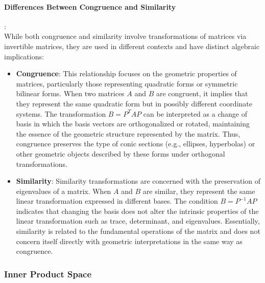 \documentclass[11pt]{book} %
\begin{document}
\paragraph{Differences Between Congruence and Similarity}: \\

While both congruence and similarity involve transformations of matrices via invertible matrices, they are used in different contexts and have distinct algebraic implications:

\begin{itemize}
    \item \textbf{Congruence}: This relationship focuses on the geometric properties of matrices, 
    particularly those representing quadratic forms or symmetric bilinear forms. When two matrices \( A \) and \( B \) are congruent, 
    it implies that they represent the same quadratic form but in possibly different coordinate systems. 
    The transformation \( B = P^T A P \) can be interpreted as a change of basis in which the basis vectors are orthogonalized or rotated, 
    maintaining the essence of the geometric structure represented by the matrix. 
    Thus, congruence preserves the type of conic sections (e.g., ellipses, hyperbolas) or other geometric objects described by these forms under orthogonal transformations.

    \item \textbf{Similarity}: Similarity transformations are concerned with the preservation of eigenvalues of a matrix. 
    When \( A \) and \( B \) are similar, they represent the same linear transformation expressed in different bases. 
    The condition \( B = P^{-1} A P \) indicates that changing the basis does not alter the intrinsic properties of the linear transformation such as 
    trace, determinant, and eigenvalues. Essentially, similarity is related to the fundamental operations of the matrix and does not 
    concern itself directly with geometric interpretations in the same way as congruence. 

\end{itemize}


\subsubsection{Inner Product Space}
\end{document}
